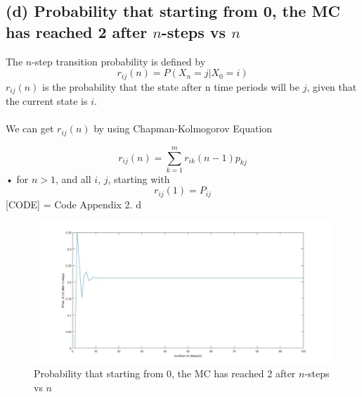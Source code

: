 \documentclass[a4paper,11pt]{report}
\begin{document}
\newpage

\subsection*{(d) Probability that starting from 0, the MC has reached 2 after $n$-steps  vs $ n$}

The $n$-step transition probability is defined by \cite{mit}\\
\begin{equation}
r_{ij}(n) = P(X_n = j | X_0 = i)
\end{equation}
$r_{ij}(n)$ is the probability that the state after n time periods will be $j$, given that the current state is $i$.\\\\
We can get $r_{ij}(n)$ by using  Chapman-Kolmogorov Equation \cite{mit}

\begin{equation}
r_{ij}(n) = \sum_{k=1}^{m}r_{ik}(n - 1)p_{kj}
\end{equation}•
for $n > 1$, and all $i$, $j$, starting with
$$r_{ij}(1) = P_{ij}$$
[CODE] = Code Appendix 2. d 
\begin{figure}[h]
\hspace*{-4cm}
        \includegraphics[scale=0.45]{2d}
        \caption{Probability that starting from 0, the MC has reached 2 after $n$-steps  vs $ n$}
\end{figure}
\newpage
\end{document}
